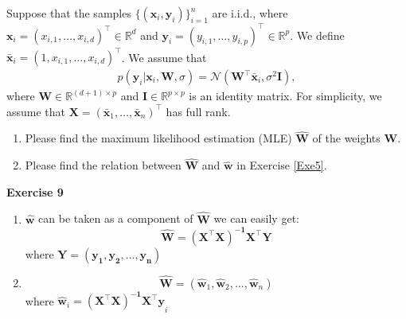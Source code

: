 \documentclass[11pt,letter,notitlepage]{article}
\begin{document}
\newpage




\begin{exercise}
Suppose that the samples $\{(\mathbf{x}_i,\mathbf{y}_i)\}^n_{i=1}$ are i.i.d., where $\mathbf{x}_i =(x_{i,1}, \dots, x_{i,d})^{\top} \in \mathbb{R}^{d}$  and $\mathbf{y}_i = (y_{i,1}, \dots, y_{i,p})^{\top} \in \mathbb{R}^{p}$. We define $\bar{\mathbf{x}}_i = (1 , x_{i,1} ,\dots , x_{i,d})^{\top} $.  We assume that 
\begin{align*}
    p(\mathbf{y}_i|\mathbf{x}_i, \mathbf{W}, \sigma ) = \mathcal{N} ( \mathbf{W}^{\top} \bar{\mathbf{x}}_i  , \sigma^2 \mathbf{I}),
\end{align*}
where $\mathbf{W} \in \mathbb{R}^{(d+1) \times p}$ and $\mathbf{I} \in \mathbb{R}^{p \times p}$ is an identity matrix.
For simplicity, we assume that $\mathbf{X} = (\bar{\mathbf{x}}_1 , \dots, \bar{\mathbf{x}}_n)^{\top}$ has full rank.

\begin{enumerate}
    \item Please find the maximum likelihood estimation (MLE) $\hat{\mathbf{W}}$ of the weights $\mathbf{W}$. 
    \item Please find the relation between $\hat{\mathbf{W}}$ and $\hat{\mathbf{w}}$ in Exercise \ref{Exe5}.
\end{enumerate}
\end{exercise}
\begin{solution}
	\textbf{Exercise 9}
	\begin{enumerate}
	 \item 
	 $\hat{\mathbf{w}}$ can be taken as a component of $\hat{\mathbf{W}}$ we can easily get: \\
	\[\hat{\mathbf{W}}=\mathbf{(X^{\top}X)^{-1}X^{\top}Y}\]
	where $\mathbf{Y=(y_1,y_2,\dots,y_n)}$
	
	\item
	\[\hat{\mathbf{W}}=(\hat{\mathbf{w}}_1, \hat{\mathbf{w}}_2,\dots,\hat{\mathbf{w}}_n)\]
	where $\hat{\mathbf{w}}_i=\mathbf{(X^{\top}X)^{-1}X^{\top}y}_i$
	\end{enumerate}

\end{solution}



\end{document}
